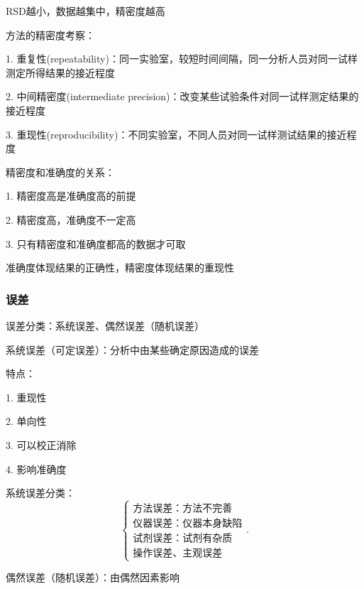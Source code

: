 \begin{eg}
RSD越小，数据越集中，精密度越高

\begin{notation}
    方法的精密度考察：

    1. 重复性(repeatability)：同一实验室，较短时间间隔，同一分析人员对同一试样测定所得结果的接近程度

    2. 中间精密度(intermediate precision)：改变某些试验条件对同一试样测定结果的接近程度

    3. 重现性(reproducibility)：不同实验室，不同人员对同一试样测试结果的接近程度
\end{notation}

\begin{notation}
    精密度和准确度的关系：

    1. 精密度高是准确度高的前提

    2. 精密度高，准确度不一定高

    3. 只有精密度和准确度都高的数据才可取
\end{notation}
\begin{notation}
    准确度体现结果的正确性，精密度体现结果的重现性
\end{notation}

\subsubsection{误差}%
\label{subsub:误差}
\begin{notation}
    误差分类：系统误差、偶然误差（随机误差）
\end{notation}
\begin{defi}
    系统误差（可定误差）：分析中由某些确定原因造成的误差

    特点：

    1. 重现性

    2. 单向性

    3. 可以校正消除

    4. 影响准确度
\end{defi}
\begin{notation}
    系统误差分类：
    \[
        \begin{cases}
            \mbox{方法误差：方法不完善}\\ 
            \mbox{仪器误差：仪器本身缺陷}\\ 
            \mbox{试剂误差：试剂有杂质}\\ 
            \mbox{操作误差、主观误差}
        \end{cases}
    .\] 
\end{notation}
\begin{defi}
    偶然误差（随机误差）：由偶然因素影响


\end{defi}
\end{eg}
